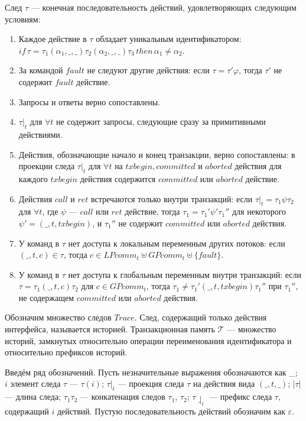 \begin{mydefinition}\label{def2} След $\tau$ --- конечная последовательность действий, удовлетворяющих следующим условиям:
\begin{enumerate}
  \item Каждое действие в $\tau$ обладает уникальным идентификатором: $if \, \tau = \tau_1 (\alpha_1,\_,\_) \tau_2 (\alpha_2,\_,\_) \tau_3 \, then \, \alpha_1 \neq \alpha_2$.   
  \item За командой $fault$ не следуют другие действия: если $\tau = \tau'\varphi$, тогда $\tau'$ не содержит $fault$ действие.
  \item Запросы и ответы верно сопоставлены.
  \item $\tau|_t$ для $\forall t$ не содержит запросы, следующие сразу за примитивными действиями.
  \item Действия, обозначающие начало и конец транзакции, верно сопоставлены: в проекции следа $\tau|_t$ для $\forall t$ на $txbegin, committed$ и $aborted$ действия для каждого $txbegin$ действия содержится $committed$ или $aborted$ действие.
  \item Действия $call$ и $ret$ встречаются только внутри транзакций: если $\tau|_t = \tau_1\psi\tau_2$ для $\forall t$, где $\psi$ --- $call$ или $ret$ действие, тогда $\tau_1 = \tau_1'\psi'\tau_1''$ для некоторого $\psi' = (\_,t,txbegin)$, и $\tau_1''$ не содержит $committed$ или $aborted$ действия.
  \item У команд в $\tau$ нет доступа к локальным переменным других потоков: если $(\_,t,c) \in \tau$, тогда $c \in LPcomm_t \uplus GPcomm_t \uplus \{ fault\}$.
  \item У команд в $\tau$ нет доступа к глобальным переменным внутри транзакций: если $\tau = \tau_1(\_,t,c)\tau_2$ для $c \in GPcomm_t$, тогда $\tau_1 \neq \tau_1'(\_,t,txbegin)\tau_1''$ при $\tau_1''$, не содержащем $committed$ или $aborted$ действия.
\end{enumerate}

\end{mydefinition}

Обозначим множество следов $Trace$. След, содержащий только действия интерфейса, называется историей. Транзакционная память $\mathcal{T}$ --- множество историй, замкнутых относительно операции переименования идентификатора и относительно префиксов историй.

Введём ряд обозначений. Пусть незначительные выражения обозначаются как \_; $i$ элемент следа $\tau$ --- $\tau(i)$; $\tau|_t$ --- проекция следа $\tau$ на действия вида $(\_,t,\_)$; $|\tau|$ --- длина следа; $\tau_1\tau_2$ --- конкатенация следов $\tau_1$, $\tau_2$; $\tau\downharpoonleft_i$ --- префикс следа $\tau$, содержащий $i$ действий. Пустую последовательность действий обозначим как $\varepsilon$.

